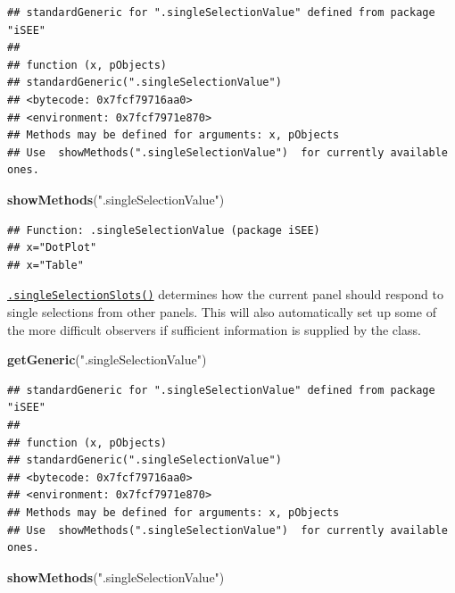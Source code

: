 \documentclass[
]{book}
\newenvironment{Shaded}{\begin{snugshade}}{\end{snugshade}}
\newcommand{\KeywordTok}[1]{\textcolor[rgb]{0.13,0.29,0.53}{\textbf{#1}}}
\newcommand{\NormalTok}[1]{#1}
\newcommand{\StringTok}[1]{\textcolor[rgb]{0.31,0.60,0.02}{#1}}
\begin{document}
\begin{verbatim}
## standardGeneric for ".singleSelectionValue" defined from package "iSEE"
## 
## function (x, pObjects) 
## standardGeneric(".singleSelectionValue")
## <bytecode: 0x7fcf79716aa0>
## <environment: 0x7fcf7971e870>
## Methods may be defined for arguments: x, pObjects
## Use  showMethods(".singleSelectionValue")  for currently available ones.
\end{verbatim}

\begin{Shaded}
\begin{Highlighting}[]
\KeywordTok{showMethods}\NormalTok{(}\StringTok{".singleSelectionValue"}\NormalTok{)}
\end{Highlighting}
\end{Shaded}

\begin{verbatim}
## Function: .singleSelectionValue (package iSEE)
## x="DotPlot"
## x="Table"
\end{verbatim}

\href{https://isee.github.io/iSEE/reference/single-select-generics.html}{\texttt{.singleSelectionSlots()}} determines how the current panel should respond to single selections from other panels.
This will also automatically set up some of the more difficult observers if sufficient information is supplied by the class.

\begin{Shaded}
\begin{Highlighting}[]
\KeywordTok{getGeneric}\NormalTok{(}\StringTok{".singleSelectionValue"}\NormalTok{)}
\end{Highlighting}
\end{Shaded}

\begin{verbatim}
## standardGeneric for ".singleSelectionValue" defined from package "iSEE"
## 
## function (x, pObjects) 
## standardGeneric(".singleSelectionValue")
## <bytecode: 0x7fcf79716aa0>
## <environment: 0x7fcf7971e870>
## Methods may be defined for arguments: x, pObjects
## Use  showMethods(".singleSelectionValue")  for currently available ones.
\end{verbatim}

\begin{Shaded}
\begin{Highlighting}[]
\KeywordTok{showMethods}\NormalTok{(}\StringTok{".singleSelectionValue"}\NormalTok{)}
\end{Highlighting}
\end{Shaded}
\end{document}

